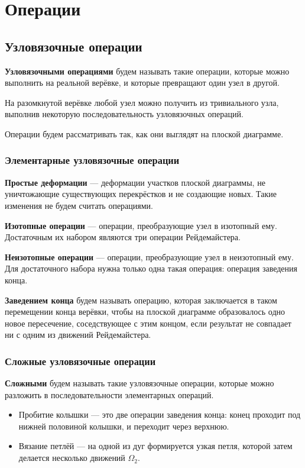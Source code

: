 \section{Операции}

\subsection{Узловязочные операции}

\textbf{Узловязочными операциями} будем называть такие операции, которые можно выполнить на реальной верёвке, и которые превращают один узел в другой.

На разомкнутой верёвке любой узел можно получить из тривиального узла, выполнив некоторую последовательность узловязочных операций.

Операции будем рассматривать так, как они выглядят на плоской диаграмме.

\subsubsection{Элементарные узловязочные операции}

\textbf{Простые деформации}  --- деформации участков плоской диаграммы, не уничтожающие существующих перекрёстков и не создающие новых. Такие изменения не будем считать операциями.

\textbf{Изотопные операции}  --- операции, преобразующие узел в изотопный ему. Достаточным их набором являются три операции Рейдемайстера.

\textbf{Неизотопные операции}  --- операции, преобразующие узел в неизотопный ему. Для достаточного набора нужна только одна такая операция: операция заведения конца.

\textbf{Заведением конца} будем называть операцию, которая заключается в таком перемещении конца верёвки, чтобы на плоской диаграмме образовалось одно новое пересечение, соседствующее с этим концом, если результат не совпадает ни с одним из движений Рейдемайстера.

\subsubsection{Сложные узловязочные операции}

\textbf{Сложными} будем называть такие узловязочные операции, которые можно разложить в последовательности элементарных операций.

\begin{itemize}
\item Пробитие колышки --- это две операции заведения конца: конец проходит под нижней половиной колышки, и переходит через верхнюю.
\item Вязание петлёй --- на одной из дуг формируется узкая петля, которой затем делается несколько движений $\Omega_2$.
\end{itemize}


